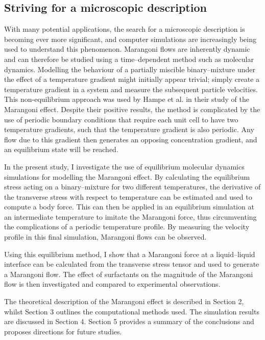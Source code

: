 \subsection{Striving for a microscopic description}
With many potential applications, the search for a microscopic description is becoming ever more significant, and computer simulations are increasingly being used to understand this phenomenon.
Marangoni flows are inherently dynamic and can therefore be studied using a time--dependent method such as molecular dynamics.
Modelling the behaviour of a partially miscible binary--mixture under the effect of a temperature gradient might initially appear trivial; simply create a temperature gradient in a system and measure the subsequent particle velocities.
This non-equilibrium approach was used by Hampe et al. in their study of the Marangoni effect.\cite{HolgerBoppHampe}
Despite their positive results, the method is complicated by the use of periodic boundary conditions that require each unit cell to have two temperature gradients, such that the temperature gradient is also periodic.
Any flow due to this gradient then generates an opposing concentration gradient, and an equilibrium state will be reached.

In the present study, I investigate the use of equilibrium molecular dynamics simulations for modelling the Marangoni effect.
By calculating the equilibrium stress acting on a binary--mixture for two different temperatures, the derivative of the transverse stress with respect to temperature can be estimated and used to compute a body force.
This can then be applied in an equilibrium simulation at an intermediate temperature to imitate the Marangoni force, thus circumventing the complications of a periodic temperature profile.
By measuring the velocity profile in this final simulation, Marangoni flows can be observed.

Using this equilibrium method, I show that a Marangoni force at a liquid--liquid interface can be calculated from the transverse stress tensor and used to generate a Marangoni flow.
The effect of surfactants on the magnitude of the Marangoni flow is then investigated and compared to experimental observations.

The theoretical description of the Marangoni effect is described in Section 2, whilst Section 3 outlines the computational methods used.
The simulation results are discussed in Section 4.
Section 5 provides a summary of the conclusions and proposes directions for future studies.
